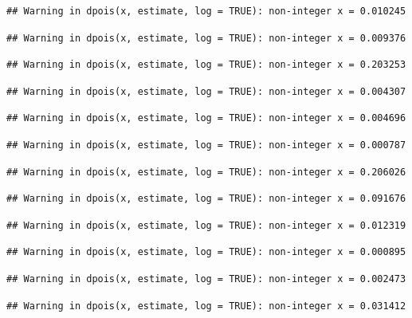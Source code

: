 \documentclass[]{article}
\begin{document}
\begin{verbatim}
## Warning in dpois(x, estimate, log = TRUE): non-integer x = 0.010245
\end{verbatim}

\begin{verbatim}
## Warning in dpois(x, estimate, log = TRUE): non-integer x = 0.009376
\end{verbatim}

\begin{verbatim}
## Warning in dpois(x, estimate, log = TRUE): non-integer x = 0.203253
\end{verbatim}

\begin{verbatim}
## Warning in dpois(x, estimate, log = TRUE): non-integer x = 0.004307
\end{verbatim}

\begin{verbatim}
## Warning in dpois(x, estimate, log = TRUE): non-integer x = 0.004696
\end{verbatim}

\begin{verbatim}
## Warning in dpois(x, estimate, log = TRUE): non-integer x = 0.000787
\end{verbatim}

\begin{verbatim}
## Warning in dpois(x, estimate, log = TRUE): non-integer x = 0.206026
\end{verbatim}

\begin{verbatim}
## Warning in dpois(x, estimate, log = TRUE): non-integer x = 0.091676
\end{verbatim}

\begin{verbatim}
## Warning in dpois(x, estimate, log = TRUE): non-integer x = 0.012319
\end{verbatim}

\begin{verbatim}
## Warning in dpois(x, estimate, log = TRUE): non-integer x = 0.000895
\end{verbatim}

\begin{verbatim}
## Warning in dpois(x, estimate, log = TRUE): non-integer x = 0.002473
\end{verbatim}

\begin{verbatim}
## Warning in dpois(x, estimate, log = TRUE): non-integer x = 0.031412
\end{verbatim}
\end{document}
